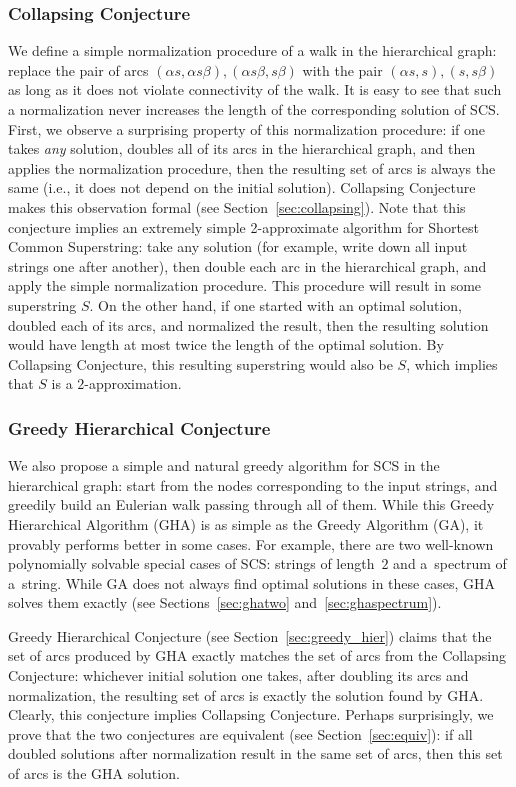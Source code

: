 \subsubsection{Collapsing Conjecture}
We define a simple normalization procedure of a walk in the hierarchical graph: replace the pair of arcs $(\alpha s, \alpha s \beta), (\alpha s \beta, s\beta)$ with the pair $(\alpha s, s ), (s , s\beta)$ as long as it does not violate connectivity of the walk. It is easy to see that such a normalization never increases the length of the corresponding solution of SCS. 
First, we observe a surprising property of this normalization procedure: if one takes \emph{any} solution, doubles all of its arcs in the hierarchical graph, and then applies the normalization procedure, then the resulting set of arcs is always the same (i.e., it does not depend on the initial solution). Collapsing Conjecture makes this observation formal (see Section~\ref{sec:collapsing}). Note that this conjecture implies an extremely simple 2-approximate algorithm for Shortest Common Superstring: take any solution (for example, write down all input strings one after another), then double each arc in the hierarchical graph, and apply the simple normalization procedure. This procedure will result in some superstring $S$. On the other hand, if one started with an optimal solution, doubled each of its arcs, and normalized the result, then the resulting solution would have length at most twice the length of the optimal solution. By Collapsing Conjecture, this resulting superstring would also be $S$, which implies that $S$ is a $2$-approximation.

\subsubsection{Greedy Hierarchical Conjecture}
We also propose a simple and natural greedy algorithm for SCS in the hierarchical graph: start from the nodes corresponding to the input strings, and greedily build an Eulerian walk passing through all of them. 
While this Greedy Hierarchical Algorithm (GHA) is as simple as the Greedy Algorithm (GA), it provably performs better in some cases. For example, there are two well-known polynomially solvable special cases of SCS: strings of length~$2$ and
a~spectrum of a~string. While GA does not always find optimal solutions in these cases, GHA solves them exactly (see Sections~\ref{sec:ghatwo} and~\ref{sec:ghaspectrum}).

Greedy Hierarchical Conjecture (see Section~\ref{sec:greedy_hier}) claims that the set of arcs produced by GHA exactly matches the set of arcs from the Collapsing Conjecture: whichever initial solution one takes, after doubling its arcs and normalization, the resulting set of arcs is exactly the solution found by GHA. Clearly, this conjecture implies Collapsing Conjecture. Perhaps surprisingly, we prove that the two conjectures are equivalent (see Section~\ref{sec:equiv}): if all doubled solutions after normalization result in the same set of arcs, then this set of arcs is the GHA solution.

